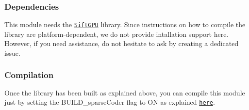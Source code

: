 \subsubsection*{Dependencies}

This module needs the \href{https://github.com/pitzer/SiftGPU}{\tt Sift\+G\+PU} library. Since instructions on how to compile the library are platform-\/dependent, we do not provide intallation support here. However, if you need assistance, do not hesitate to ask by creating a dedicated issue.

\subsubsection*{Compilation}

Once the library has been built as explained above, you can compile this module just by setting the {\ttfamily B\+U\+I\+L\+D\+\_\+sparse\+Coder} flag to {\ttfamily ON} as explained \href{https://www.github.com/robotology/himrep#compilation}{\tt here}. 